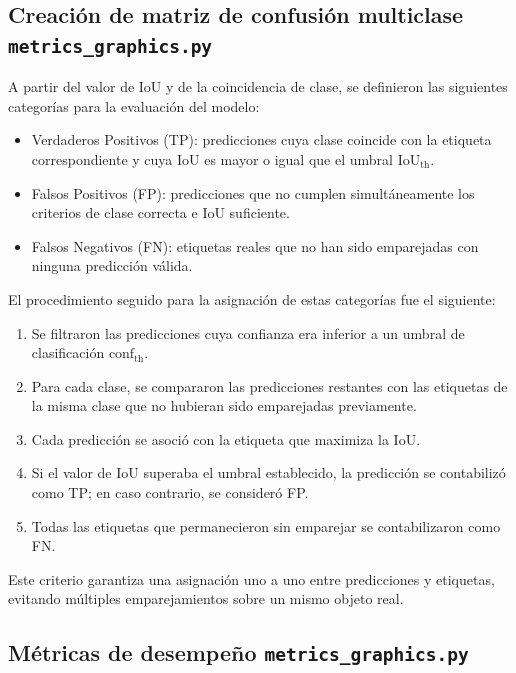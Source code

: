 \documentclass{article}
\begin{document}
	\subsection{Creación de matriz de confusión multiclase \texttt{metrics\_graphics.py}}
	
	A partir del valor de IoU y de la coincidencia de clase, se definieron las siguientes categorías para la evaluación del modelo:
	
	\begin{itemize}
		\item Verdaderos Positivos (TP): predicciones cuya clase coincide con la etiqueta correspondiente y cuya IoU es mayor o igual que el umbral $\text{IoU}_{\text{th}}$.
		\item Falsos Positivos (FP): predicciones que no cumplen simultáneamente los criterios de clase correcta e IoU suficiente.
		\newpage
		\item Falsos Negativos (FN): etiquetas reales que no han sido emparejadas con ninguna predicción válida.
	\end{itemize}
	
	El procedimiento seguido para la asignación de estas categorías fue el siguiente:
	
	\begin{enumerate}
		\item Se filtraron las predicciones cuya confianza era inferior a un umbral de clasificación $\text{conf}_{\text{th}}$.
		\item Para cada clase, se compararon las predicciones restantes con las etiquetas de la misma clase que no hubieran sido emparejadas previamente.
		\item Cada predicción se asoció con la etiqueta que maximiza la IoU.
		\item Si el valor de IoU superaba el umbral establecido, la predicción se contabilizó como TP; en caso contrario, se consideró FP.
		\item Todas las etiquetas que permanecieron sin emparejar se contabilizaron como FN.
	\end{enumerate}
	
	Este criterio garantiza una asignación uno a uno entre predicciones y etiquetas, evitando múltiples emparejamientos sobre un mismo objeto real.
	
	\subsection{Métricas de desempeño \texttt{metrics\_graphics.py}}
	
\end{document}
